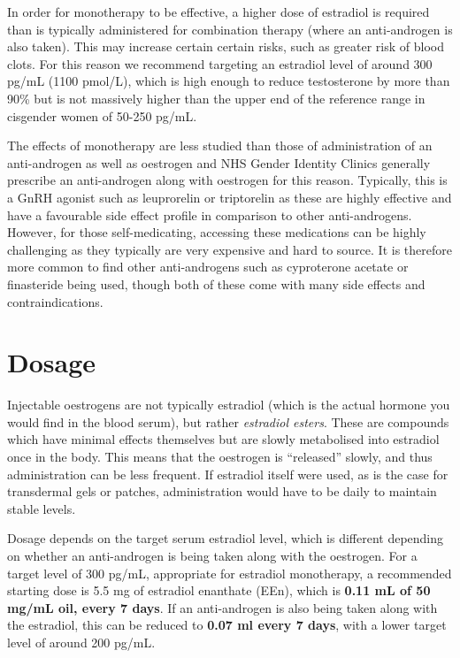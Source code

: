\documentclass[twoside,a5paper]{article}
\begin{document}
In order for monotherapy to be effective, a higher dose of estradiol
is required than is typically administered for combination therapy
(where an anti-androgen is also taken).  This may increase certain
certain risks, such as greater risk of blood clots.  For this reason
we recommend targeting an estradiol level of around 300 pg/mL (1100
pmol/L), which is high enough to reduce testosterone by more than 90\%
but is not massively higher than the upper end of the reference range
in cisgender women of 50-250 pg/mL.

The effects of monotherapy are less studied than those of
administration of an anti-androgen as well as oestrogen and NHS Gender
Identity Clinics generally prescribe an anti-androgen along with
oestrogen for this reason.  Typically, this is a GnRH agonist such as
leuprorelin or triptorelin as these are highly effective and have a
favourable side effect profile in comparison to other anti-androgens.
However, for those self-medicating, accessing these medications can be
highly challenging as they typically are very expensive and hard to
source.  It is therefore more common to find other anti-androgens such
as cyproterone acetate or finasteride being used, though both of these
come with many side effects and contraindications.

\section{Dosage}

Injectable oestrogens are not typically estradiol (which is the actual
hormone you would find in the blood serum), but rather
\textit{estradiol esters}.  These are compounds which have minimal
effects themselves but are slowly metabolised into estradiol once in
the body.  This means that the oestrogen is ``released'' slowly, and
thus administration can be less frequent.  If estradiol itself were
used, as is the case for transdermal gels or patches, administration
would have to be daily to maintain stable levels.

Dosage depends on the target serum estradiol level, which is different
depending on whether an anti-androgen is being taken along with the
oestrogen.  For a target level of 300 pg/mL, appropriate for estradiol
monotherapy, a recommended starting dose is 5.5 mg of estradiol
enanthate (EEn), which is \textbf{0.11 mL of 50 mg/mL oil, every 7
  days}.  If an anti-androgen is also being taken along with the
estradiol, this can be reduced to \textbf{0.07 ml every 7 days}, with
a lower target level of around 200 pg/mL.
\end{document}

